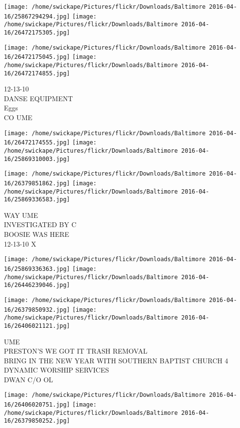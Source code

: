 \documentclass[10pt,letterpaper]{article}
\begin{document}
\texttt{[image: /home/swickape/Pictures/flickr/Downloads/Baltimore 2016-04-16/25867294294.jpg]}
\texttt{[image: /home/swickape/Pictures/flickr/Downloads/Baltimore 2016-04-16/26472175305.jpg]}

\texttt{[image: /home/swickape/Pictures/flickr/Downloads/Baltimore 2016-04-16/26472175045.jpg]}
\texttt{[image: /home/swickape/Pictures/flickr/Downloads/Baltimore 2016-04-16/26472174855.jpg]}

12{-}13{-}10\\
DANSE EQUIPMENT\\
Eggs\\
CO UME
\pagebreak

\texttt{[image: /home/swickape/Pictures/flickr/Downloads/Baltimore 2016-04-16/26472174555.jpg]}
\texttt{[image: /home/swickape/Pictures/flickr/Downloads/Baltimore 2016-04-16/25869310003.jpg]}

\texttt{[image: /home/swickape/Pictures/flickr/Downloads/Baltimore 2016-04-16/26379851862.jpg]}
\texttt{[image: /home/swickape/Pictures/flickr/Downloads/Baltimore 2016-04-16/25869336583.jpg]}

WAY UME\\
INVESTIGATED BY C\\
BOOSIE WAS HERE\\
12{-}13{-}10 X
\pagebreak

\texttt{[image: /home/swickape/Pictures/flickr/Downloads/Baltimore 2016-04-16/25869336363.jpg]}
\texttt{[image: /home/swickape/Pictures/flickr/Downloads/Baltimore 2016-04-16/26446239046.jpg]}

\texttt{[image: /home/swickape/Pictures/flickr/Downloads/Baltimore 2016-04-16/26379850932.jpg]}
\texttt{[image: /home/swickape/Pictures/flickr/Downloads/Baltimore 2016-04-16/26406021121.jpg]}

UME\\
PRESTON'S WE GOT IT TRASH REMOVAL\\
BRING IN THE NEW YEAR WITH SOUTHERN BAPTIST CHURCH 4 DYNAMIC WORSHIP SERVICES\\
DWAN C/O OL
\pagebreak

\texttt{[image: /home/swickape/Pictures/flickr/Downloads/Baltimore 2016-04-16/26406020751.jpg]}
\texttt{[image: /home/swickape/Pictures/flickr/Downloads/Baltimore 2016-04-16/26379850252.jpg]}
\end{document}
